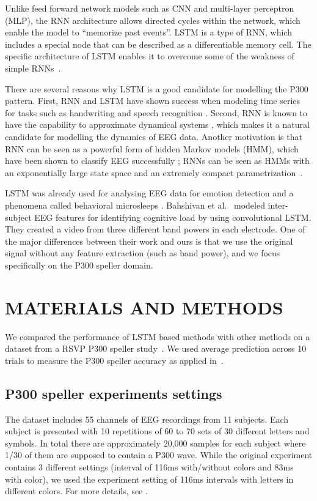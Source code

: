 \documentclass[
12pt, %
english, %
doublespacing, %
headsepline, %
]{MastersDoctoralThesis} %
\begin{document}
Unlike feed forward network models such as CNN and multi-layer perceptron (MLP),  the RNN architecture allows directed cycles within the network, which enable the model to ``memorize past events''. LSTM \cite{LSTM_origin} is a type of RNN, which includes a special node that can be described as a differentiable memory cell. The specific architecture of LSTM enables it to overcome some of the weakness of simple RNNs~\cite{bengio1994learning}.

There are several reasons why LSTM is a good candidate for modelling the P300 pattern. First, RNN and LSTM have shown success when modeling time series for tasks such as handwriting and speech recognition \cite{graves2013speech,  graves2008unconstrained, yue2015beyond}. Second, RNN is known to have the capability to approximate dynamical systems \cite{li2005approximation}, which makes it a natural candidate for modelling the dynamics of EEG data. Another motivation is that RNN can be seen as a powerful form of hidden Markov models (HMM), which have been shown to classify EEG successfully \cite{solhjoo2005classification,obermaier2001hidden,cincotti2003comparison}; RNNs can be seen as HMMs with an exponentially large state space and an extremely compact parametrization~\cite{sutskever2009recurrent}.

LSTM was already used for analysing EEG data for emotion detection \cite{soleymani2014continuous} and a phenomena called behavioral microsleeps \cite{davidson2005detecting}. Bahshivan et al.~\cite{LSTM_EEG} modeled inter-subject EEG features for identifying cognitive load by using convolutional LSTM. They created a video from three different band powers in each electrode. One of the major differences between their work and ours is that we use the original signal without any feature extraction (such as band power), and we focus specifically on the P300 speller domain.
\chapter{MATERIALS AND METHODS}

We compared the performance of LSTM based methods with other methods on a dataset from a RSVP P300 speller study~\cite{BlaknertzExperiment}. We used  average prediction across 10 trials to measure the P300 speller accuracy as applied in~\cite{BlaknertzExperiment}.

\section{P300 speller experiments settings}
The dataset includes 55 channels of EEG recordings from 11 subjects. Each subject is presented with 10 repetitions of 60 to 70 sets of 30 different letters and symbols. In total there are approximately 20,000 samples for each subject where 1/30 of them are supposed to contain a P300 wave. While the original experiment contains 3 different settings (interval of 116ms with/without colors and 83ms with color), we used the experiment setting of 116ms intervals with letters in different colors. For more details, see \cite{BlaknertzExperiment}. 
\end{document}

